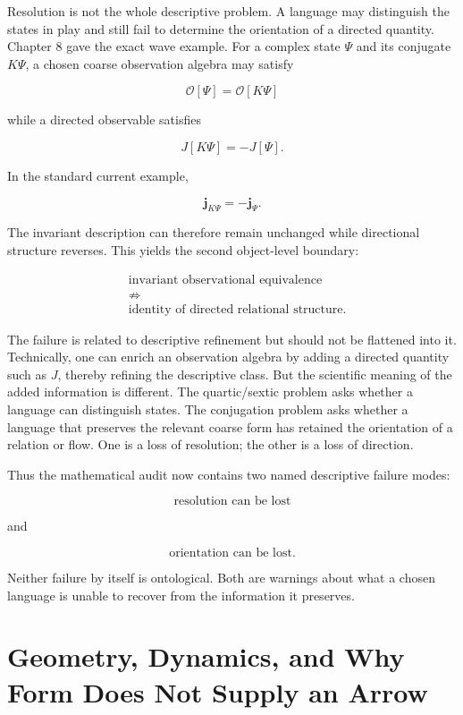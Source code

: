 Resolution is not the whole descriptive problem. A language may distinguish the states in play and still fail to determine the orientation of a directed quantity. Chapter 8 gave the exact wave example. For a complex state \(\Psi\) and its conjugate \(K\Psi\), a chosen coarse observation algebra may satisfy

\[
\mathcal O[\Psi]=\mathcal O[K\Psi]
\]

while a directed observable satisfies

\[
J[K\Psi]=-J[\Psi].
\]

In the standard current example,

\[
\mathbf j_{K\Psi}=-\mathbf j_{\Psi}.
\]

The invariant description can therefore remain unchanged while directional structure reverses. This yields the second object-level boundary:

\[
\boxed{
\begin{aligned}
&\text{invariant observational equivalence}\\
&\not\Rightarrow\\
&\text{identity of directed relational structure}.
\end{aligned}
}
\]

The failure is related to descriptive refinement but should not be flattened into it. Technically, one can enrich an observation algebra by adding a directed quantity such as \(J\), thereby refining the descriptive class. But the scientific meaning of the added information is different. The quartic/sextic problem asks whether a language can distinguish states. The conjugation problem asks whether a language that preserves the relevant coarse form has retained the orientation of a relation or flow. One is a loss of resolution; the other is a loss of direction.

Thus the mathematical audit now contains two named descriptive failure modes:

\[
\boxed{
\text{resolution can be lost}
}
\]

and

\[
\boxed{
\text{orientation can be lost}.
}
\]

Neither failure by itself is ontological. Both are warnings about what a chosen language is unable to recover from the information it preserves.

\section{Geometry, Dynamics, and Why Form Does Not Supply an Arrow}

